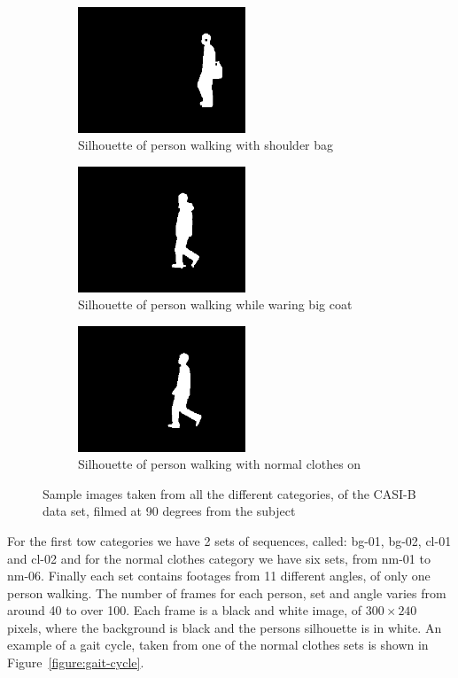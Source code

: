 \documentclass[12pt]{article}
\theoremstyle{definition}
\begin{document}
	\begin{figure}[h]
		\centering

		\begin{subfigure}{6cm}
			\centering\includegraphics[width=5cm]{silhouettes/001-bg-01-090-045.png}
			\caption{Silhouette of person walking with shoulder bag}
		\end{subfigure}
		\hspace{0.5cm}
		\begin{subfigure}{6cm}
			\centering\includegraphics[width=5cm]{silhouettes/001-cl-01-090-062.png}
			\caption{Silhouette of person walking while waring big coat}
		\end{subfigure}

		\vspace{0.5cm}
		\begin{subfigure}{6cm}
			\centering\includegraphics[width=5cm]{silhouettes/001-nm-01-090-066.png}
			\caption{Silhouette of person walking with normal clothes on}
		\end{subfigure}

		\caption{Sample images taken from all the different categories, of the CASI-B data set, filmed at 90 degrees from the subject}
		\label{figure:image-categories-sample}
	\end{figure}

	For the first tow categories we have 2 sets of sequences, called: bg-01, bg-02, cl-01 and cl-02 and for the normal clothes category we have six sets, from nm-01 to nm-06. Finally each set contains footages from 11 different angles, of only one person walking. The number of frames for each person, set and angle varies from around 40 to over 100. Each frame is a black and white image, of $300 \times 240$ pixels, where the background is black and the persons silhouette is in white. An example of a gait cycle, taken from one of the normal clothes sets is shown in Figure~\ref{figure:gait-cycle}.
\end{document}
